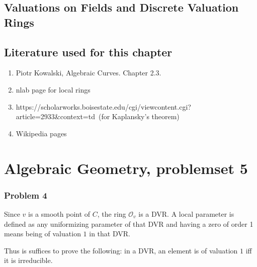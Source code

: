 \section{Valuations on Fields and Discrete Valuation Rings}





\section{Literature used for this chapter}

\begin{enumerate}
    \item Piotr Kowalski, Algebraic Curves. Chapter 2.3.
    \item nlab page for local rings
    \item https://scholarworks.boisestate.edu/cgi/viewcontent.cgi?article=2933\&context=td\
          (for Kaplansky's theorem)
    \item Wikipedia pages
\end{enumerate}

\chapter{Algebraic Geometry, problemset 5}

\subsection*{Problem 4}

Since \( v \) is a smooth point of \( C \), the ring \( \mathcal{O}_v \)
is a DVR. A local parameter is defined as any uniformizing parameter
of that DVR and having a zero of order 1 means being of valuation \( 1 \)
in that DVR.

Thus is suffices to prove the following: in a DVR, an element is of valuation
\( 1 \) iff it is irreducible.

